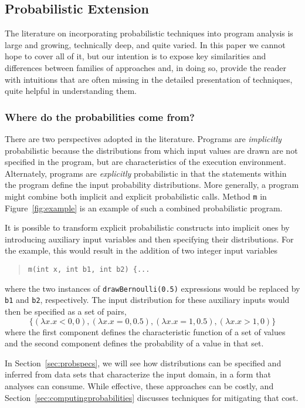 \subsection{Probabilistic Extension}
\label{sec:overview}

The literature on incorporating probabilistic techniques into 
program analysis is large and growing, technically deep, and quite
varied.  In this paper we cannot hope to cover all of it, but our
intention is to expose key similarities and differences between 
families of approaches and, in doing so, provide the reader with
intuitions that are often missing in the detailed presentation of
techniques, quite helpful in understanding them.

\subsubsection{Where do the probabilities come from?}
There are two perspectives adopted in the literature.
Programs are \textit{implicitly} probabilistic because the distributions
from which input values are drawn are not specified in the program,
but are characteristics of the execution environment.
Alternately, programs are \textit{explicitly} probabilistic in 
that the statements
within the program define the input probability distributions.
More generally, a program might combine both implicit and explicit
probabilistic calls.  Method \texttt{m} in Figure~\ref{fig:example}
is an example of such a combined probabilistic program.

It is possible to transform explicit probabilistic constructs
into implicit ones
by introducing auxiliary input variables and then specifying
their distributions.   For the example, this would result
in the addition of two integer input variables 
\begin{quote}
\texttt{m(int x, int b1, int b2) \{...} 
\end{quote}
where the two instances of
\texttt{drawBernoulli(0.5)} expressions would be replaced
by \texttt{b1} and \texttt{b2}, respectively.  The input
distribution for these auxiliary inputs would then be specified
as a set of pairs,
\[
\{ (\lambda x.x<0,0), (\lambda x.x=0,0.5), (\lambda x.x=1,0.5), (\lambda x.x>1,0) \}
\]
where the first component defines the characteristic function
of a set of values and the second component defines the probability
of a value in that set.

In Section~\ref{sec:probspecs}, we will see how distributions can
be specified and inferred from data sets that characterize the
input domain, in a form that 
analyses can consume.  While effective, these approaches can be
costly, and Section~\ref{sec:computingprobabilities} discusses
techniques for mitigating that cost.

